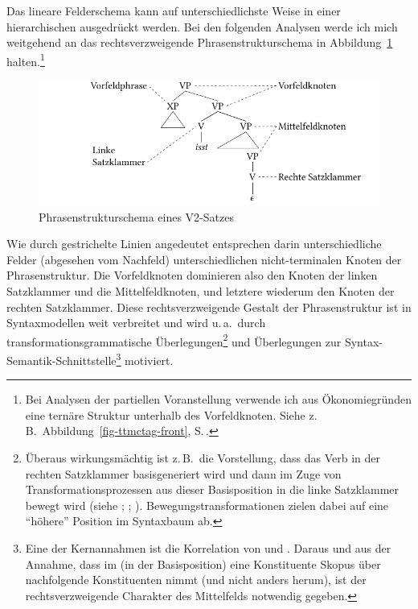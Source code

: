 Das lineare Felderschema kann auf unterschiedlichste Weise in einer hierarchischen  ausgedrückt werden. Bei den folgenden Analysen werde ich mich weitgehend an das rechtsverzweigende Phrasenstrukturschema in Abbildung~\ref{fig-ttmctag-ps-1} halten.\footnote{Bei Analysen der partiellen Voranstellung verwende ich aus Ökonomiegründen eine ternäre Struktur unterhalb des Vorfeldknoten. Siehe z.\,B.\ Abbildung~\ref{fig-ttmctag-front}, S.\,\pageref{fig-ttmctag-front}.}
\begin{figure}[t]
\centering
\includegraphics{graphics/abb75.pdf}
\caption{\label{fig-ttmctag-ps-1} Phrasenstrukturschema eines V2-Satzes}
\end{figure} 
Wie durch gestrichelte Linien angedeutet entsprechen darin unterschiedliche Felder (abgesehen vom Nachfeld) unterschiedlichen nicht-termi\-nalen Knoten der Phrasenstruktur. Die Vorfeldknoten dominieren also den Knoten der linken Satzklammer und die Mittelfeldknoten, und letztere wiederum den Knoten der rechten Satzklammer. Diese rechtsverzweigende Gestalt der Phrasenstruktur ist in Syntaxmodellen weit verbreitet und wird u.\,a.\ durch transformationsgrammatische Überlegungen\footnote{Überaus wirkungsmächtig  ist z.\,B.\ die Vorstellung, dass das Verb in der rechten Satzklammer basisgeneriert wird und dann im Zuge von Transformationsprozessen aus dieser Basisposition in die linke Satzklammer bewegt wird (siehe \citealt[Abschnitt~2.2.2]{Stechow:Sternefeld:88}; \citealt[Abschnitte~III.4 und III.5]{Sternefeld:06}; \citealt[Abschnitt~3.2]{Mueller:10}). Bewegungstransformationen zielen dabei auf eine "`höhere"' Position im Syntaxbaum ab.} und Überlegungen zur Syntax-Semantik-Schnittstelle\footnote{Eine der Kernannahmen ist die Korrelation von  und . Daraus und aus der Annahme, dass im  (in der Basisposition) eine Konstituente Skopus über nachfolgende Konstituenten nimmt (und nicht anders herum), ist der rechtsverzweigende Charakter des Mittelfelds notwendig gegeben.%
} motiviert.

